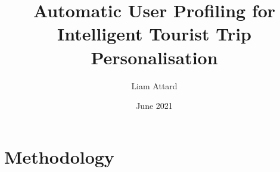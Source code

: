 \documentclass{aifyp}
\title{Automatic User Profiling for Intelligent
Tourist Trip Personalisation}
\author{Liam Attard}
\date{June 2021}
\begin{document}
 



\pagebreak
\section{Methodology}



\end{document}
